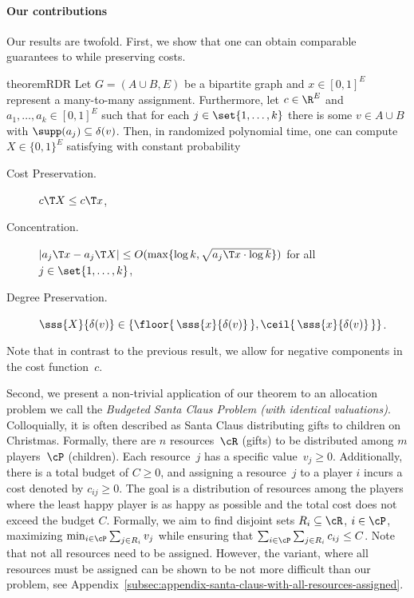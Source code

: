 \documentclass[a4paper,USenglish,cleveref,thm-restate]{lipics-v2021}
\begin{document}
\paragraph*{Our contributions}
Our results are twofold.
First, we show that one can obtain comparable guarantees to  while preserving costs. 
\begin{restatable}{theorem}{RDR}
    \label{thm:assign}
    Let $G = (A\cup B, E)$ be a bipartite graph and
    $x\in [0, 1]^{E}$ represent a many-to-many assignment.
    Furthermore, let $c\in\R^{E}$ and $a_1,\dotsc,a_k\in [0, 1]^E$ such
    that for each $j \in \set{1,\dotsc,k}$ there is some $v\in A\cup B$
    with $\supp(a_j) \subseteq \delta(v)$.
    Then, in randomized polynomial time, one can compute
    $X\in \{0, 1\}^E$ satisfying with constant probability
    \begin{description}
        \item[Cost Preservation.] \hspace{0.46cm} $c\T X \le c\T x$,
        \item[Concentration.] \hspace{1.03cm} $|a_j\T x - a_j\T X| \le
            O(\max\{\log k, \sqrt{a_j\T x \cdot \log k}\})$ for all $j\in \set{1,\dotsc,k}$,
        \item[Degree Preservation.] \hspace{0.05cm} $\sss{X}{\delta(v)} \in \{\floor{\, \sss{x}{\delta(v)} \,}, \ceil{\, \sss{x}{\delta(v)} \,} \}$.
    \end{description}
\end{restatable}
\medskip \noindent Note that in contrast to the previous result, we allow for negative components in the cost function~$c$.

Second, we present a non-trivial application of our theorem to an allocation problem we call the \emph{Budgeted Santa Claus Problem (with identical valuations)}.
Colloquially, it is often described as Santa Claus distributing gifts to children on Christmas.
Formally, there are $n$ resources~$\cR$ (gifts) to be distributed among $m$ players~$\cP$ (children). 
Each resource~$j$ has a specific value~$v_j \ge 0$.
Additionally, there is a total budget of $C \ge 0$, and assigning a resource~$j$ to a player $i$ incurs
a cost denoted by $c_{ij} \ge 0$. 
The goal is a distribution of resources among the players where the least happy player is as happy as possible and
the total cost does not exceed the budget $C$. 
Formally, we aim to find disjoint sets $R_i\subseteq \cR $, $i\in \cP$, maximizing $\min_{i\in\cP} \sum_{j \in R_i} v_{j}$
while ensuring that $\sum_{i\in\cP }^{}\sum_{j\in R_i}^{} c_{ij} \leq C$.
Note that not all resources need to be assigned. However, the variant, where all resources must be assigned can be shown to be 
not more difficult than our problem, see Appendix~\ref{subsec:appendix-santa-claus-with-all-resources-assigned}.
\end{document}

